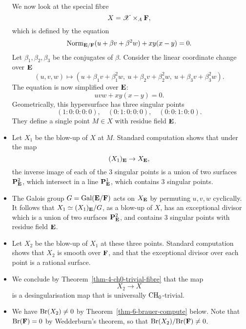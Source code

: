 \begin{itemize}
        We now look at the special fibre
        \[ X = \mathscr{X} \times_A \bbF, \]
        which is defined by the equation 
        \[ \operatorname{Norm}_{\bbE / \bbF} (u + \beta v + \beta^2 w) + x y (x - y) = 0. \]
        Let $\beta_1, \beta_2, \beta_3$ be the conjugates of $\beta$. 
        Consider the linear coordinate change over $\bbE$
        \begin{equation} \label{eq-6-coord-change}
            (u, v, w) \mapsto (
                u + \beta_1 v + \beta_1^2 w,\ 
                u + \beta_2 v + \beta_2^2 w,\ 
                u + \beta_3 v + \beta_3^2 w
            ).
        \end{equation}
        The equation is now simplified over $\bbE$:
        \[ uvw + xy (x - y) = 0. \]
        Geometrically,
        this hypersurface has three singular points
        \begin{equation} \label{eq-6-singular-points}
            (1 : 0 : 0 : 0 : 0), \quad
            (0 : 1 : 0 : 0 : 0), \quad
            (0 : 0 : 1 : 0 : 0). 
        \end{equation}
        They define a single point $M \in X$ with residue field $\bbE$.
    \item
        Let $X_1$ be the blow-up of $X$ at $M$.
        Standard computation shows that under the map
        \[ (X_1)_{\bbE} \to X_{\bbE}, \]
        the inverse image of each of the $3$ singular points
        is a union of two surfaces $\bbP_{\bbE}^2$, which intersect in a line $\bbP_{\bbE}^1$,
        which contains $3$ singular points. 
    \item
        The Galois group $G = \operatorname{Gal}(\bbE/\bbF)$ acts on $X_{\bbE}$
        by permuting $u,v,w$ cyclically. 
        It follows that $X_1 \simeq (X_1)_{\bbE} / G$, as a blow-up of $X$,
        has an exceptional divisor which is a union of two surfaces $\bbP_{\bbE}^2$,
        and contains $3$ singular points with residue field $\bbE$.
    \item
        Let $X_2$ be the blow-up of $X_1$ at these three points.
        Standard computation shows that $X_2$ is smooth over $\bbF$,
        and that the exceptional divisor over each point is a rational surface.
    \item
        We conclude by Theorem~\ref{thm-4-ch0-trivial-fibre} that the map
        \[ X_2 \to X \]
        is a desingularisation map that is universally $\mathrm{CH}_0$-trivial.
    \item
        We have $\mathrm{Br}(X_2) \neq 0$ by Theorem~\ref{thm-6-brauer-compute} below.
        Note that $\Br(\bbF) = 0$ by Wedderburn's theorem,
        so that $\Br(X_2) / \Br(\bbF) \neq 0$.
\end{itemize}


